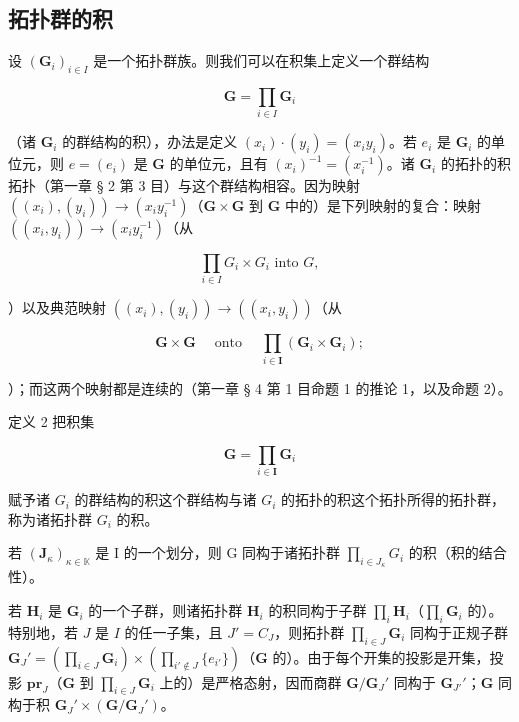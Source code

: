 \subsection{拓扑群的积}

设 \((\mathbf{G}_i)_{i\in I}\) 是一个拓扑群族。则我们可以在积集上定义一个群结构

\[
\mathbf {G} = \prod_ {i \in I} \mathbf {G} _ {i}
\]

（诸 \(\mathbf{G}_i\) 的群结构的积），办法是定义 \((x_i) \cdot (y_i) = (x_i y_i)\)。若 \(e_i\) 是 \(\mathbf{G}_i\) 的单位元，则 \(e = (e_i)\) 是 \(\mathbf{G}\) 的单位元，且有 \((x_i)^{-1} = (x_i^{-1})\)。诸 \(\mathbf{G}_i\) 的拓扑的积拓扑（第一章 § 2 第 3 目）与这个群结构相容。因为映射 \(((x_i), (y_i)) \to (x_i y_i^{-1})\)（\(\mathbf{G} \times \mathbf{G}\) 到 \(\mathbf{G}\) 中的）是下列映射的复合：映射 \(((x_i, y_i)) \to (x_i y_i^{-1})\)（从

\[
\prod_ {i \in I} G _ {i} \times G _ {i} \text {   into   } G,
\]

）以及典范映射 \(((x_{i}), (y_{i})) \to ((x_{i}, y_{i}))\)（从

\[
\mathbf {G} \times \mathbf {G} \quad \text { onto } \quad \prod_ {i \in \mathbf {I}} (\mathbf {G} _ {i} \times \mathbf {G} _ {i});
\]

）；而这两个映射都是连续的（第一章 § 4 第 1 目命题 1 的推论 1，以及命题 2）。

定义 2 把积集

\[
\mathbf {G} = \prod_ {i \in \mathbf {I}} \mathbf {G} _ {i}
\]

赋予诸 \(G_{i}\) 的群结构的积这个群结构与诸 \(G_{i}\) 的拓扑的积这个拓扑所得的拓扑群，称为诸拓扑群 \(G_{i}\) 的积。

若 \((\mathbf{J}_{\kappa})_{\kappa \in \mathbb{K}}\) 是 I 的一个划分，则 G 同构于诸拓扑群 \(\prod_{i \in J_{\kappa}} G_{i}\) 的积（积的结合性）。

若 \(\mathbf{H}_{i}\) 是 \(\mathbf{G}_{i}\) 的一个子群，则诸拓扑群 \(\mathbf{H}_{i}\) 的积同构于子群 \(\prod_{i} \mathbf{H}_{i}\)（\(\prod_{i} \mathbf{G}_{i}\) 的）。特别地，若 \(J\) 是 \(I\) 的任一子集，且 \(J' = C_{J}\)，则拓扑群 \(\prod_{i \in J} \mathbf{G}_{i}\) 同构于正规子群 \(\mathbf{G}_{J}' = (\prod_{i \in J} \mathbf{G}_{i}) \times (\prod_{i' \notin J} \{e_{i'}\})\)（\(\mathbf{G}\) 的）。由于每个开集的投影是开集，投影 \(\mathbf{pr}_{J}\)（\(\mathbf{G}\) 到 \(\prod_{i \in J} \mathbf{G}_{i}\) 上的）是严格态射，因而商群 \(\mathbf{G} / \mathbf{G}_{J}'\) 同构于 \(\mathbf{G}_{J'}'\)；\(\mathbf{G}\) 同构于积 \(\mathbf{G}_{J}' \times (\mathbf{G} / \mathbf{G}_{J}')\)。

